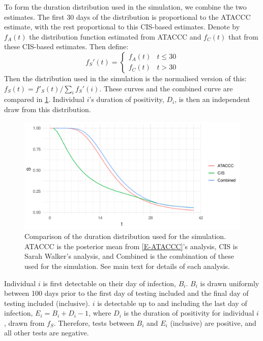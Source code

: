 \documentclass[thesis.tex]{subfiles}
\begin{document}
To form the duration distribution used in the simulation, we combine the two estimates.
The first 30 days of the distribution is proportional to the ATACCC estimate, with the rest proportional to this CIS-based estimates.
Denote by $f_A(t)$ the distribution function estimated from ATACCC and $f_C(t)$ that from these CIS-based estimates.
Then define:
$$
f_S'(t) = \begin{cases}
	f_A(t) &t \leq 30 \\
	f_C(t) &t > 30
\end{cases}
$$
Then the distribution used in the simulation is the normalised version of this: $f_S(t) = f'_S(t)/\sum_i f_S'(i)$.
These curves and the combined curve are compared in \cref{perf-test:fig:duration-dist}.
Individual $i$'s duration of positivity, $D_i$, is then an independent draw from this distribution.
\begin{figure}
  \centering \includegraphics{cis-perfect-testing/input-duration-dists}
  \caption[Comparison of duration distributions]{Comparison of the duration distribution used for the simulation. ATACCC is the posterior mean from \cref{E-ATACCC}'s analysis, CIS is Sarah Walker's analysis, and Combined is the combination of these used for the simulation. See main text for details of each analysis. \label{perf-test:fig:duration-dist}}
\end{figure}

Individual $i$ is first detectable on their day of infection, $B_i$.
$B_i$ is drawn uniformly between 100 days prior to the first day of testing included and the final day of testing included (inclusive).
$i$ is detectable up to and including the last day of infection, $E_i = B_i + D_i - 1$, where $D_i$ is the duration of positivity for individual $i$, drawn from $f_S$.
Therefore, tests between $B_i$ and $E_i$ (inclusive) are positive, and all other tests are negative.
\end{document}
